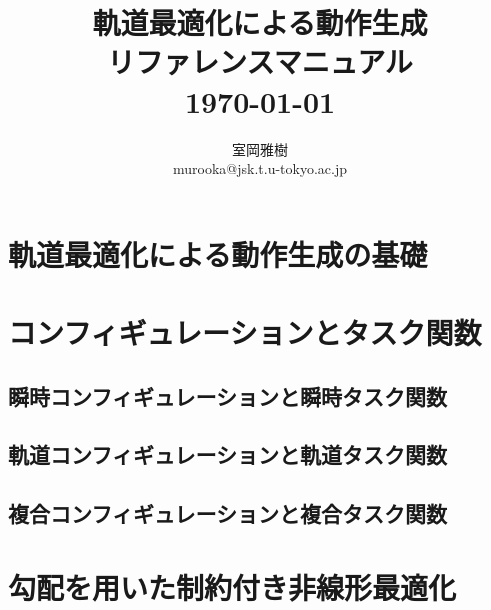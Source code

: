\documentclass[]{jarticle}
\begin{document}
\newenvironment{refdesc}{
 \vspace{5mm} \parindent=0mm \topsep=0mm \parskip=0mm \leftmargin=10mm}{
             \parindent=10mm \topsep=3mm \parskip=1mm \leftmargin=0mm }


\date{}
\title{{\LARGE \bf 軌道最適化による動作生成 \\ リファレンスマニュアル} \\
\vspace{10mm}
{\large \today} \\
}

\author{
室岡雅樹 \\
murooka@jsk.t.u-tokyo.ac.jp \\
}

\thispagestyle{empty}
\maketitle
{}
\tableofcontents

\newpage
{}

\section{軌道最適化による動作生成の基礎} \label{chap:fundamental}


\section{コンフィギュレーションとタスク関数} \label{chap:config-task}
\subsection{瞬時コンフィギュレーションと瞬時タスク関数} \label{sec:instant-config-task}

\subsection{軌道コンフィギュレーションと軌道タスク関数} \label{sec:trajectory-config-task}

\subsection{複合コンフィギュレーションと複合タスク関数} \label{sec:compound-config-task}


\section{勾配を用いた制約付き非線形最適化} \label{chap:sqp}
\end{document}
